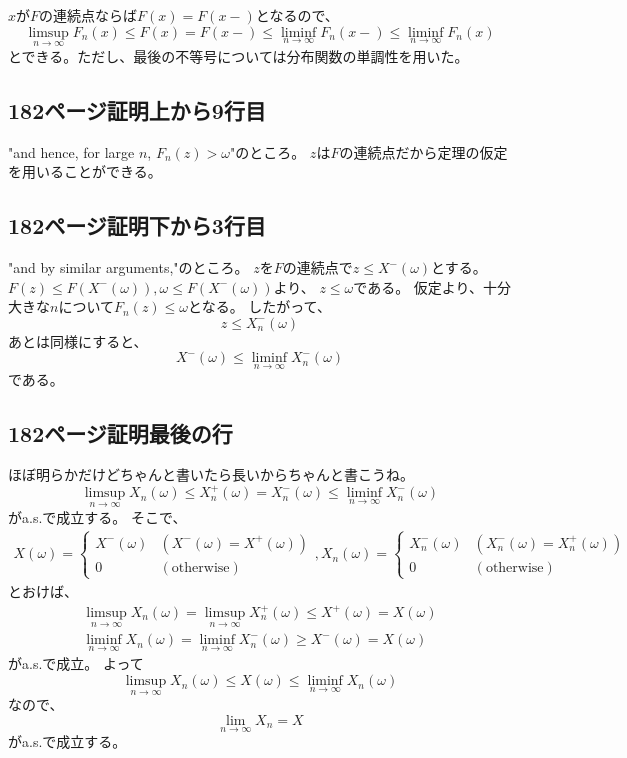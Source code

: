     $x$が$F$の連続点ならば$F(x) = F(x -)$となるので、
    \[
      \limsup_{n \to \infty}F_n(x) \leq F(x) = F(x-)
      \leq \liminf_{n \to \infty} F_n(x-)
      \leq \liminf_{n \to \infty} F_n(x)
    \]
    とできる。ただし、最後の不等号については分布関数の単調性を用いた。

  \subsection{182ページ証明上から9行目}
    "and hence, for large $n$, $F_n(z) > \omega$"のところ。
    $z$は$F$の連続点だから定理の仮定を用いることができる。
  \subsection{182ページ証明下から3行目}
    "and by similar arguments,"のところ。
    $z$を$F$の連続点で$z \leq X^-(\omega)$とする。
    $F(z) \leq F(X^-(\omega)), \omega \leq F(X^-(\omega))$より、
    $z \leq \omega$である。
    仮定より、十分大きな$n$について$F_n(z) \leq \omega$となる。
    したがって、
    \[
      z \leq X_n^-(\omega)
    \]
    あとは同様にすると、
    \[
      X^-(\omega) \leq \liminf_{n\to \infty}X_n^-(\omega)
    \]
    である。
  \subsection{182ページ証明最後の行}
    ほぼ明らかだけどちゃんと書いたら長いからちゃんと書こうね。
    \[
      \limsup_{n \to \infty}X_n(\omega) \leq X_n^+(\omega) = X_n^-(\omega) \leq \liminf_{n \to \infty}X_n^-(\omega)
    \]
    がa.s.で成立する。
    そこで、
    \begin{align*}
      X(\omega) = \begin{cases}
        X^-(\omega) & (X^-(\omega) = X^+(\omega))\\
        0 & (\text{otherwise})
      \end{cases}
      ,
      X_n(\omega) = \begin{cases}
      X_n^-(\omega) & (X_n^-(\omega) = X_n^+(\omega))\\
      0 & (\text{otherwise})
    \end{cases}
    \end{align*}
    とおけば、
    \begin{align*}
      \limsup_{n \to \infty}X_n(\omega) = \limsup_{n \to \infty}X_n^+(\omega) \leq X^+(\omega) = X(\omega)\\
      \liminf_{n \to \infty}X_n(\omega) = \liminf_{n \to \infty}X_n^-(\omega) \ge X^-(\omega) = X(\omega)
    \end{align*}
    がa.s.で成立。
    よって
    \[
      \limsup_{n \to \infty}X_n(\omega) \leq X(\omega) \leq \liminf_{n \to \infty}X_n(\omega)
    \]
    なので、
    \[
      \lim_{n\to \infty}X_n = X
    \]
    がa.s.で成立する。


